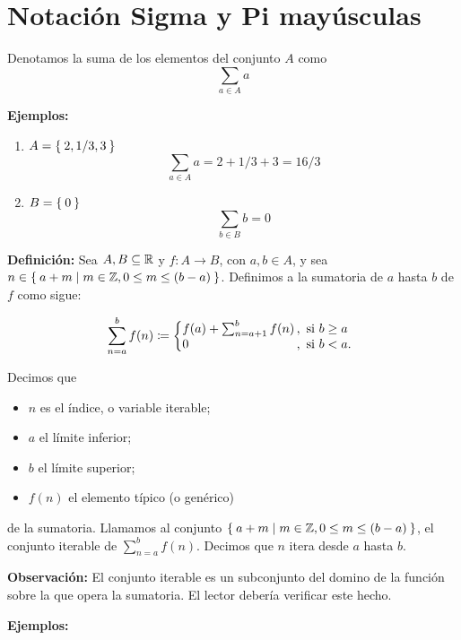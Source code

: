 \part*{Notación Sigma y Pi mayúsculas}

Denotamos la suma de los elementos del conjunto $A$ como \[\sum_{a\in A} a\]

\textbf{Ejemplos:}

\begin{enumerate}
  \item $A=\Set{2, 1/3, 3}$ \[\sum_{a\in A} a = 2 + 1/3 + 3 = 16/3\]
  \item $B=\Set{0}$ \[\sum_{b\in B} b = 0\]
\end{enumerate}

\textbf{Definición:} Sea $A, B\subseteq \mathbb{R}$ y $f:A \to B$, con $a,b\in A$, y sea $n \in \Set{a + m | m\in \mathbb{Z}, 0\leq m \leq (b-a)}$. Definimos a la sumatoria de $a$ hasta $b$ de $f$ como sigue:

\[
    \sum_{n=a}^{b} f(n) \defined \left\{
    \begin{array}{@{}l@{\thinspace}l}
    f(a) + \sum_{n=a+1}^{b} f(n) &,  \ \text{si}  \ b\geq a\\
    0 &,  \ \text{si}  \ b<a.
    \end{array} \right. \]

Decimos que
\begin{itemize}
  \item $n$ es el índice, o variable iterable;
  \item $a$ el límite inferior;
  \item $b$ el límite superior;
  \item $f(n)$ el elemento típico (o genérico)
\end{itemize}
de la sumatoria. Llamamos al conjunto $\Set{a + m | m\in \mathbb{Z}, 0\leq m \leq (b-a)}$, el conjunto iterable de $\sum_{n=a}^{b} f(n)$. Decimos que $n$ itera desde $a$ hasta $b$.

\textbf{Observación:} El conjunto iterable es un subconjunto del domino de la función sobre la que opera la sumatoria. El lector debería verificar este hecho.

\textbf{Ejemplos:}

